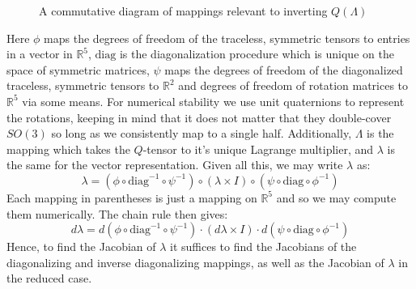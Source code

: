 \documentclass[reqno]{article}
\begin{document}
  \begin{figure}[h]
    \centering
    \caption{A commutative diagram of mappings relevant to inverting
      $Q(\Lambda)$}
    \label{fig:commutative-diagram}
  \end{figure}
  Here $\phi$ maps the degrees of freedom of the traceless, symmetric
  tensors to entries in a vector in $\mathbb{R}^5$, $\text{diag}$ is the
  diagonalization procedure which is unique on the space of symmetric matrices,
  $\psi$ maps the degrees of freedom of the diagonalized traceless, symmetric
  tensors to $\mathbb{R}^2$ and degrees of freedom of rotation matrices to
  $\mathbb{R}^5$ via some means.
  For numerical stability we use unit quaternions to represent the rotations, keeping
  in mind that it does not matter that they double-cover $SO(3)$ so long as we
  consistently map to a single half.
  Additionally, $\Lambda$ is the mapping which takes the $Q$-tensor to it's
  unique Lagrange multiplier, and $\lambda$ is the same for the vector
  representation.
  Given all this, we may write $\lambda$ as:
  \begin{equation}
    \lambda
    =
    \left( \phi \circ \text{diag}^{-1} \circ \psi^{-1} \right) \circ
    \left( \lambda \times I \right) \circ
    \left( \psi \circ \text{diag} \circ \phi^{-1} \right)
  \end{equation}
  Each mapping in parentheses is just a mapping on $\mathbb{R}^5$ and so we may
  compute them numerically.
  The chain rule then gives:
  \begin{equation}
    d \lambda
    =
    d\left( \phi \circ \text{diag}^{-1} \circ \psi^{-1} \right)
    \cdot \left( d\lambda \times I \right)
    \cdot d\left( \psi \circ \text{diag} \circ \phi^{-1} \right)
  \end{equation}
  Hence, to find the Jacobian of $\lambda$ it suffices to find the Jacobians of
  the diagonalizing and inverse diagonalizing mappings, as well as the Jacobian
  of $\lambda$ in the reduced case.
  
\end{document}
